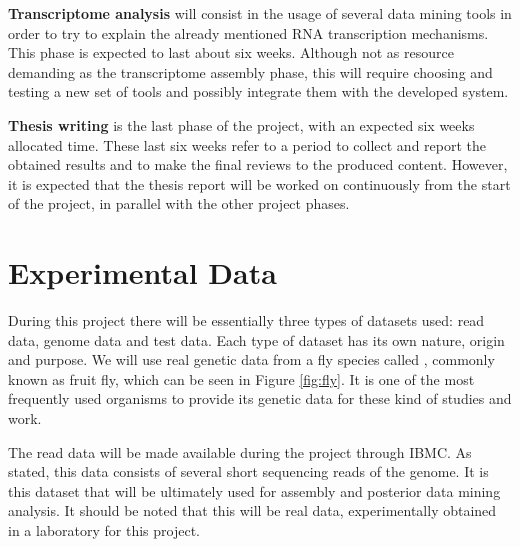 \begin{description}
  \item \textbf{Transcriptome analysis}
  will consist in the usage of several data mining tools in order to try to
  explain the already mentioned RNA transcription mechanisms. This phase is
  expected to last about six weeks. Although not as resource demanding as the
  transcriptome assembly phase, this will require choosing and testing a new
  set of tools and possibly integrate them with the developed system.

  \item \textbf{Thesis writing}
  is the last phase of the project, with an expected six weeks allocated time.
  These last six weeks refer to a period to collect and report the obtained
  results and to make the final reviews to the produced content. However, it is
  expected that the thesis report will be worked on continuously from the start 
  of the project, in parallel with the other project phases.

\end{description}

\section{Experimental Data}\label{sec:datasets}

During this project there will be essentially three types of datasets used: read
data, genome data and test data. Each type of dataset has its own nature, origin
and purpose. We will use real genetic data from a fly species called \fly{},
commonly known as fruit fly, which can be seen in Figure \ref{fig:fly}. It is
one of the most frequently used organisms to provide its genetic data for these
kind of studies and work.


The read data will be made available during the project through IBMC. As stated,
this data consists of several short sequencing reads of the \fly{} genome. It is
this dataset that will be ultimately used for assembly and posterior data mining
analysis. It should be noted that this will be real data, experimentally
obtained in a laboratory for this project.

